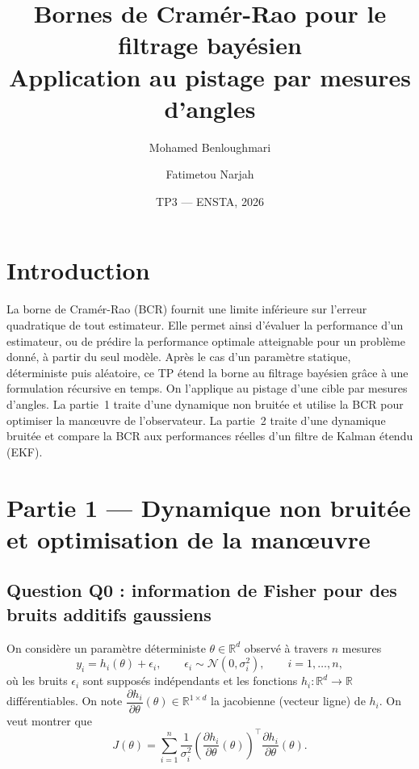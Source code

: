 \documentclass[11pt,a4paper]{article}
\title{\textbf{Bornes de Cramér-Rao pour le filtrage bayésien\\[2pt]
\large Application au pistage par mesures d'angles}}
\author{Mohamed Benloughmari \and Fatimetou Narjah}
\date{TP3 --- ENSTA, 2026}
\newcommand{\N}{\mathcal{N}}
\theoremstyle{remark}
\begin{document}
\maketitle

\section*{Introduction}

La borne de Cramér-Rao (BCR) fournit une limite inférieure sur l'erreur quadratique de tout estimateur. Elle permet ainsi d'évaluer la performance d'un estimateur, ou de prédire la performance optimale atteignable pour un problème donné, à partir du seul modèle.
Après le cas d'un paramètre statique, déterministe puis aléatoire, ce TP étend la borne au filtrage bayésien grâce à une formulation récursive en temps.
On l'applique au pistage d'une cible par mesures d'angles. La partie~1 traite d'une dynamique non bruitée et utilise la BCR pour optimiser la manœuvre de l'observateur.
La partie~2 traite d'une dynamique bruitée et compare la BCR aux performances réelles d'un filtre de Kalman étendu (EKF).

\section{Partie 1 --- Dynamique non bruitée et optimisation de la manœuvre}

\subsection{Question Q0 : information de Fisher pour des bruits additifs gaussiens}

On considère un paramètre déterministe $\theta \in \mathbb{R}^d$ observé à travers $n$ mesures
\begin{equation}
y_i = h_i(\theta) + \epsilon_i, \qquad \epsilon_i \sim \N(0, \sigma_i^2), \qquad i = 1, \dots, n,
\end{equation}
où les bruits $\epsilon_i$ sont supposés indépendants et les fonctions $h_i : \mathbb{R}^d \to \mathbb{R}$ différentiables. On note $\dfrac{\partial h_i}{\partial \theta}(\theta) \in \mathbb{R}^{1\times d}$ la jacobienne (vecteur ligne) de $h_i$. On veut montrer que
\begin{equation}
\boxed{\;
J(\theta) = \sum_{i=1}^{n} \frac{1}{\sigma_i^2}
\left(\frac{\partial h_i}{\partial \theta}(\theta)\right)^{\!\top}
\frac{\partial h_i}{\partial \theta}(\theta).
\;}
\label{eq:q0}
\end{equation}
\end{document}
